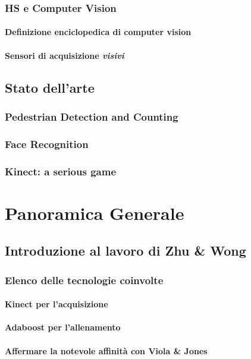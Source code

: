             \subsubsection{HS e Computer Vision}
                \paragraph{Definizione enciclopedica di computer vision}
                \paragraph{Sensori di acquisizione \emph{visivi}}
        \subsection{Stato dell'arte}
            \subsubsection{Pedestrian Detection and Counting}
            \subsubsection{Face Recognition}
            \subsubsection{Kinect: a serious game}
    \section{Panoramica Generale}
    \label{sec:overview}
        \subsection{Introduzione al lavoro di Zhu & Wong}
            \subsubsection{Elenco delle tecnologie coinvolte}
                \paragraph{Kinect per l'acquisizione}
                \paragraph{Adaboost per l'allenamento}
                \paragraph{Affermare la notevole affinità con Viola & Jones}
